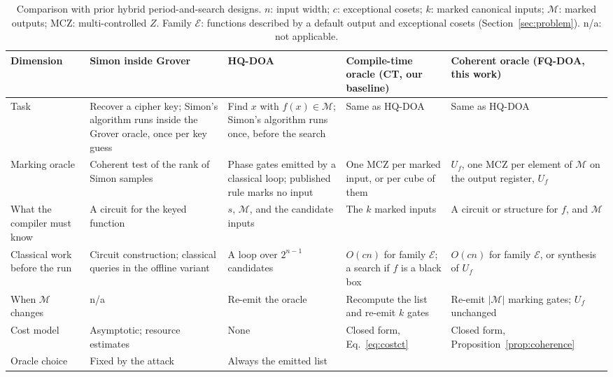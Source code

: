 \documentclass[journal]{IEEEtran}
\newcommand{\famE}{\mathcal{E}}
\begin{document}
\begin{table}[!t]
\caption{Comparison with prior hybrid period-and-search designs. $n$: input width;
$c$: exceptional cosets; $k$: marked canonical inputs; $\mathcal{M}$: marked
outputs; MCZ: multi-controlled $Z$. Family $\famE$: functions described by a
default output and exceptional cosets (Section~\ref{sec:problem}). n/a: not
applicable.}
\label{tab:prior}
\centering
\footnotesize
\renewcommand{\arraystretch}{1.12}
\setlength{\tabcolsep}{4pt}
\begin{tabular}{@{}>{\raggedright\arraybackslash}p{}
  >{\raggedright\arraybackslash}p{}
  >{\raggedright\arraybackslash}p{}
  >{\raggedright\arraybackslash}p{}
  >{\raggedright\arraybackslash}p{}@{}}
\toprule
Dimension & Simon inside Grover~\cite{leander2017grover,bonnetain2019quantum,bonnetain2022quantum,xia2025tight}
 & HQ-DOA~\cite{patil2026quantum} & Compile-time oracle (CT, our baseline)
 & Coherent oracle (FQ-DOA, this work) \\
\midrule
Task & Recover a cipher key; Simon's algorithm runs inside the Grover oracle, once per key guess
 & Find $x$ with $f(x)\in\mathcal{M}$; Simon's algorithm runs once, before the search & Same as HQ-DOA & Same as HQ-DOA \\
Marking oracle & Coherent test of the rank of Simon samples
 & Phase gates emitted by a classical loop; published rule marks no input
 & One MCZ per marked input, or per cube of them & $U_f$, one MCZ per element of $\mathcal{M}$ on the output register, $U_f$ \\
What the compiler must know & A circuit for the keyed function
 & $s$, $\mathcal{M}$, and the candidate inputs & The $k$ marked inputs
 & A circuit or structure for $f$, and $\mathcal{M}$ \\
Classical work before the run & Circuit construction; classical queries in the offline variant
 & A loop over $2^{n-1}$ candidates & $O(cn)$ for family $\famE$; a search if $f$ is a black box
 & $O(cn)$ for family $\famE$, or synthesis of $U_f$ \\
When $\mathcal{M}$ changes & n/a & Re-emit the oracle & Recompute the list and re-emit $k$ gates
 & Re-emit $|\mathcal{M}|$ marking gates; $U_f$ unchanged \\
Cost model & Asymptotic; resource estimates~\cite{bonnetain2022quantum} & None
 & Closed form, Eq.~\eqref{eq:costct} & Closed form, Proposition~\ref{prop:coherence} \\
Oracle choice & Fixed by the attack & Always the emitted list
 & \multicolumn{2}{>{\raggedright\arraybackslash}p{0.4\textwidth}@{}}{Made per target by the selection pass of Section~\ref{sec:select}} \\
\bottomrule
\end{tabular}
\end{table}
\end{document}
